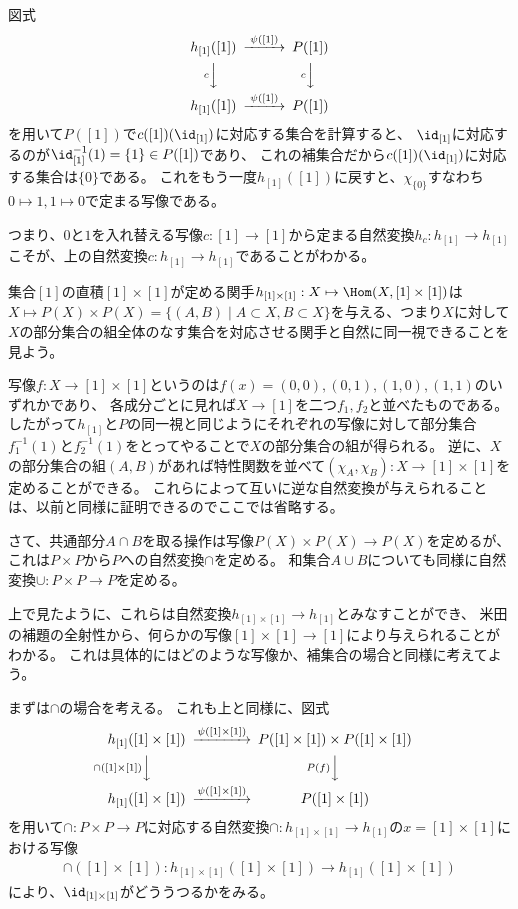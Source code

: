 \documentclass[uplatex]{jsarticle}
\begin{document}
図式
\begin{align*}
\begin{CD}
h_{[1]}([1])@>\psi([1])>>P([1])\\
@VcVV@VcVV\\
h_{[1]}([1])@>\psi([1])>>P([1])
\end{CD}
\end{align*}
を用いて$P([1])$で$c([1])(\id_{[1]})$に対応する集合を計算すると、
$\id_{[1]}$に対応するのが$\id_{[1]}^{-1}(1)=\{1\}\in P([1])$であり、
これの補集合だから$c([1])(\id_{[1]})$に対応する集合は$\{0\}$である。
これをもう一度$h_{[1]}([1])$に戻すと、$\chi_{\{0\}}$すなわち$0\mapsto 1, 1\mapsto 0$で定まる写像である。

つまり、$0$と$1$を入れ替える写像$c:[1] \to [1]$から定まる自然変換$h_c:h_{[1]} \to h_{[1]}$こそが、上の自然変換$c:h_{[1]} \to h_{[1]}$であることがわかる。

\vspace{10pt}


集合$[1]$の直積$[1]\times [1]$が定める関手$h_{[1]\times[1]}:X\mapsto\Hom(X,[1] \times [1])$は
$X\mapsto P(X)\times P(X)=\{(A,B)\mid A\subset X, B\subset X\}$を与える、つまり$X$に対して$X$の部分集合の組全体のなす集合を対応させる関手と自然に同一視できることを見よう。

写像$f:X \to [1] \times [1]$というのは$f(x)=(0,0), (0,1), (1,0), (1,1)$のいずれかであり、
各成分ごとに見れば$X \to [1]$を二つ$f_1, f_2$と並べたものである。
したがって$h_{[1]}$と$P$の同一視と同じようにそれぞれの写像に対して部分集合$f_1^{-1}(1)$と$f_2^{-1}(1)$をとってやることで$X$の部分集合の組が得られる。
逆に、$X$の部分集合の組$(A, B)$があれば特性関数を並べて$(\chi_A, \chi_B):X \to [1] \times [1]$を定めることができる。
これらによって互いに逆な自然変換が与えられることは、以前と同様に証明できるのでここでは省略する。
\vspace{10pt}

さて、共通部分$A\cap B$を取る操作は写像$P(X) \times P(X) \to P(X)$を定めるが、これは$P\times P$から$P$への自然変換$\cap$を定める。
和集合$A\cup B$についても同様に自然変換$\cup:P \times P \to P$を定める。

上で見たように、これらは自然変換$h_{[1]\times[1]} \to h_{[1]}$とみなすことができ、
米田の補題の全射性から、何らかの写像$[1]\times [1] \to [1]$により与えられることがわかる。
これは具体的にはどのような写像か、補集合の場合と同様に考えてよう。

まずは$\cap$の場合を考える。
これも上と同様に、図式
\begin{align*}
\begin{CD}
h_{[1]}([1]\times[1])@>\psi([1]\times[1])>>P([1]\times[1])\times P([1]\times[1])\\
@V\cap([1]\times[1])VV@VP(f)VV\\
h_{[1]}([1]\times[1])@>\psi([1]\times[1])>>P([1]\times[1])
\end{CD}
\end{align*}
を用いて$\cap:P\times P \to P$に対応する自然変換$\cap:h_{[1]\times[1]} \to h_{[1]}$の$x=[1]\times[1]$における写像\begin{align*}
\cap([1]\times[1]):h_{[1]\times[1]}([1]\times[1]) \to h_{[1]}([1]\times[1])
\end{align*}
により、$\id_{[1]\times[1]}$がどううつるかをみる。
\end{document}
